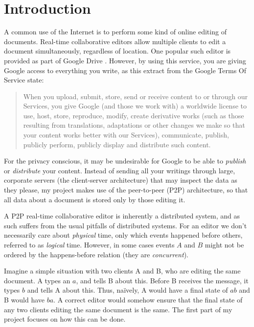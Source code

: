 \documentclass[diss.tex]{subfiles}
\begin{document}
\chapter{Introduction}
\label{chap:introduction}
A common use of the Internet is to perform some kind of online editing of documents. Real-time collaborative editors allow multiple clients to edit a document simultaneously, regardless of location. One popular such editor is provided as part of Google Drive \cite{googledrive}. However, by using this service, you are giving Google access to everything you write, as this extract from the Google Terms Of Service \cite{googletos} state: \begin{quote}
When you upload, submit, store, send or receive content to or through our Services, you give Google (and those we work with) a worldwide license to use, host, store, reproduce, modify, create derivative works (such as those resulting from translations, adaptations or other changes we make so that your content works better with our Services), communicate, publish, publicly perform, publicly display and distribute such content.
\end{quote} 
For the privacy conscious, it may be undesirable for Google to be able to \textit{publish} or \textit{distribute} your content. Instead of sending all your writings through large, corporate servers (the client-server architecture) that may inspect the data as they please, my project makes use of the peer-to-peer (P2P) architecture, so that all data about a document is stored only by those editing it.

A P2P real-time collaborative editor is inherently a distributed system, and as such suffers from the usual pitfalls of distributed systems. For an editor we don't necessarily care about \textit{physical} time, only which events happened before others, referred to as \textit{logical} time. However, in some cases events $A$ and $B$ might not be ordered by the happens-before \cite{lamportshappensbefore} relation (they are \textit{concurrent}).

Imagine a simple situation with two clients A and B, who are editing the same document. A types an $a$, and tells B about this. Before B receives the message, it types $b$ and tells A about this. Thus, na{\"i}vely, A would have a final state of $ab$ and B would have $ba$. A correct editor would somehow ensure that the final state of any two clients editing the same document is the same. The first part of my project focuses on how this can be done.
\end{document}
